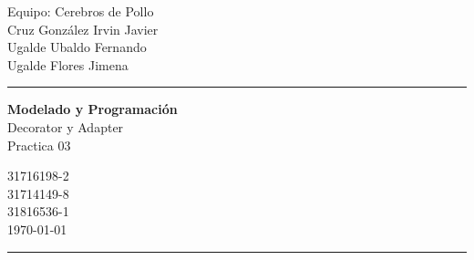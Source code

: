 \documentclass[a4paper,10pt]{article}
\begin{document}
\fancyhead[C]{}
\begin{minipage}{0.295\textwidth} 
\raggedright
Equipo: Cerebros de Pollo\\    
\footnotesize 
\colorbox[rgb]{0.67, 0.88, 0.69}{Cruz González Irvin Javier}
\\\colorbox[rgb]{0.06, 0.75, 0.99 }{Ugalde Ubaldo Fernando}
\\\colorbox[rgb]{0.96, 0.76, 0.76}{Ugalde Flores Jimena}

\textcolor[rgb]{0.0, 0.72, 0.92}{\medskip\hrule}
\end{minipage}
\begin{minipage}{0.4\textwidth} 
\centering 
\large 
\textbf{Modelado y Programación}\\ 
\normalsize 
Decorator y Adapter \\Practica 03\\
\end{minipage}
\begin{minipage}{0.295\textwidth} 
\raggedleft
\footnotesize
\colorbox[rgb]{0.67, 0.88, 0.69}{31716198-2}\\
\colorbox[rgb]{0.06, 0.75, 0.99 }{31714149-8}\\
\colorbox[rgb]{0.96, 0.76, 0.76}{31816536-1}\\
\today
\textcolor[rgb]{0.0, 0.72, 0.92}{\medskip\hrule}
\end{minipage}
\end{document}
